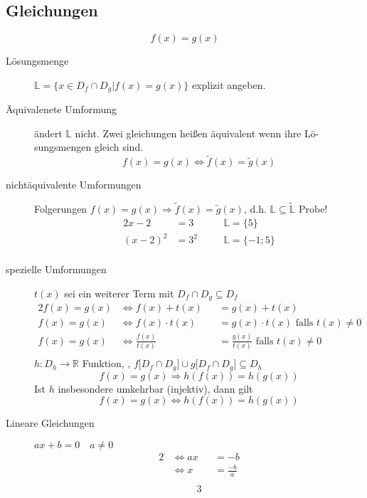 \documentclass[12pt,a4paper]{article}
\begin{document}
\subsection{Gleichungen}
$$f(x)=g(x)$$
\begin{description}
	\item[Lösungsmenge] $\mathbb{L} = \lbrace x \in D_f \cap D_g | f(x) = g(x) \rbrace$ explizit angeben.
	\item[Äquivalenete Umformung] ändert $\mathbb{L}$ nicht. Zwei gleichungen heißen äquivalent wenn ihre Lö-sungsmengen gleich sind.
		$$f(x)= g(x) \Leftrightarrow \widetilde{f}(x) = \widetilde{g}(x)$$
	\item[nichtäquivalente Umformungen]
		Folgerungen $f(x) = g(x) \Rightarrow \widetilde{f}(x) = \widetilde{g}(x)$, d.h. $\mathbb{L} \subseteq \widetilde{\mathbb{L}}$ Probe!
		\begin{alignat*}{2}
			x-2     & = 3 \quad    &  & \mathbb{L} = \lbrace 5 \rbrace     \\
			(x-2)^2 & = 3^2  \quad &  & \mathbb{L} = \lbrace -1; 5 \rbrace \\
		\end{alignat*}
	\item[spezielle Umformungen] $t(x)$ sei ein weiterer Term mit $D_f \cap D_g \subseteq D_f$
		\begin{alignat*}{2}
			f(x) = g(x) & \Leftrightarrow f(x) + t(x)       &  & = g(x) + t(x)                                     \\
			f(x) = g(x) & \Leftrightarrow f(x) \cdot t(x)   &  & = g(x) \cdot t(x)\textrm{ falls } t(x) \not = 0   \\
			f(x) = g(x) & \Leftrightarrow \frac{f(x)}{t(x)} &  & = \frac{g(x)}{t(x)}\textrm{ falls } t(x) \not = 0 \\
		\end{alignat*}
		$h : D_h \longrightarrow \mathbb{R}$ Funktion, , $f\lbrack D_f \cap D_g \rbrack \cup g\lbrack D_f \cap D_g \rbrack \subseteq D_h$
		$$f(x) = g(x) \Rightarrow h(f(x)) = h(g(x))$$
		Ist $h$ insbesondere umkehrbar (injektiv), dann gilt
		$$f(x) = g(x) \Leftrightarrow h(f(x)) = h(g(x))$$
	\item[Lineare Gleichungen] $ax + b = 0 \quad a \not = 0$
		\begin{alignat*}{2}
			 & \Leftrightarrow ax &  & = -b           \\
			 & \Leftrightarrow x  &  & = \frac{-b}{a} \\
		\end{alignat*}
		\begin{alignat*}{3}

\end{alignat*}
\end{description}
\end{document}
